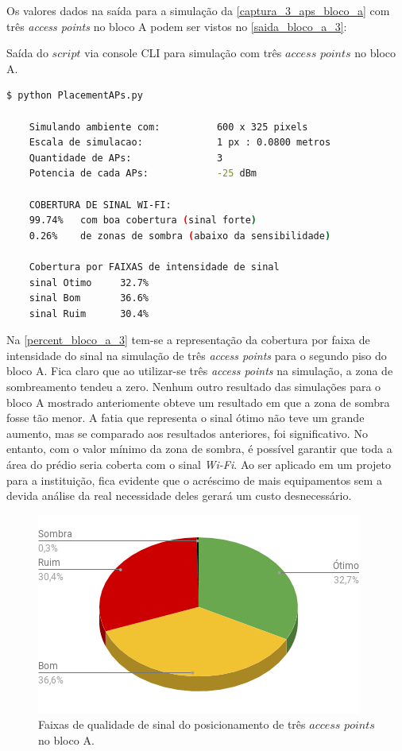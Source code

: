 \documentclass[
	12pt,				%
	twoside,			%
	a4paper,			%
	english,			%
	french,				%
	spanish,			%
	brazil				%
	]{abntex2}
\begin{document}
Os valores dados na saída para a simulação da
\autoref{captura_3_aps_bloco_a} com três \emph{access points} no bloco A
podem ser vistos no \autoref{saida_bloco_a_3}:

\begin{quadro}[!htb]
    \caption{\label{saida_bloco_a_3} Saída do $script$ via console CLI para simulação com três $access$ $points$ no bloco A. }

    \begin{lstlisting}[language=bash]
    $ python PlacementAPs.py 

    Simulando ambiente com:          600 x 325 pixels
    Escala de simulacao:             1 px : 0.0800 metros
    Quantidade de APs:               3
    Potencia de cada APs:            -25 dBm

    COBERTURA DE SINAL WI-FI:
    99.74%   com boa cobertura (sinal forte)
    0.26%    de zonas de sombra (abaixo da sensibilidade)

    Cobertura por FAIXAS de intensidade de sinal
    sinal Otimo     32.7%
    sinal Bom       36.6%
    sinal Ruim      30.4%
    \end{lstlisting}

\end{quadro}

Na \autoref{percent_bloco_a_3} tem-se a representação da cobertura por
faixa de intensidade do sinal na simulação de três \emph{access points}
para o segundo piso do bloco A. Fica claro que ao utilizar-se três
\emph{access points} na simulação, a zona de sombreamento tendeu a zero.
Nenhum outro resultado das simulações para o bloco A mostrado
anteriomente obteve um resultado em que a zona de sombra fosse tão
menor. A fatia que representa o sinal ótimo não teve um grande aumento,
mas se comparado aos resultados anteriores, foi significativo. No
entanto, com o valor mínimo da zona de sombra, é possível garantir que
toda a área do prédio seria coberta com o sinal \emph{Wi-Fi}. Ao ser
aplicado em um projeto para a instituição, fica evidente que o acréscimo
de mais equipamentos sem a devida análise da real necessidade deles
gerará um custo desnecessário.

\begin{figure}[!ht]
    \caption{\label{percent_bloco_a_3} Faixas de qualidade de sinal do posicionamento de três $access$ $points$ no bloco A.}
    \begin{center}
        \includegraphics[scale=0.56]{imagens/percent-bloco-a-3.png}
    \end{center}
\end{figure}
\end{document}
